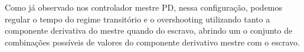 Como já observado nos controlador mestre PD, nessa configuração, podemos regular o tempo do regime transitório e o overshooting
utilizando tanto a componente derivativa do mestre quando do escravo, abrindo um o conjunto de combinações possíveis de
valores do componente derivativo mestre com o escravo.
